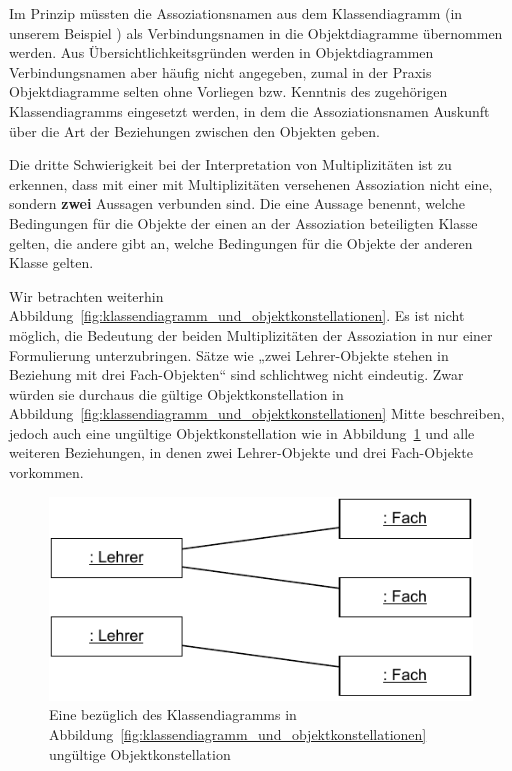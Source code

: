 Im Prinzip müssten die Assoziationsnamen aus dem Klassendiagramm (in unserem Beispiel ) als Verbindungsnamen in die Objektdiagramme übernommen werden. Aus Übersichtlichkeitsgründen werden in Objektdiagrammen Verbindungsnamen aber häufig nicht angegeben, zumal in der Praxis Objektdiagramme selten ohne Vorliegen bzw. Kenntnis des zugehörigen Klassendiagramms eingesetzt werden, in dem die Assoziationsnamen Auskunft über die Art der Beziehungen zwischen den Objekten geben.

Die dritte Schwierigkeit bei der Interpretation von Multiplizitäten ist zu erkennen, dass mit einer mit Multiplizitäten versehenen Assoziation nicht eine, sondern \textbf{zwei} Aussagen verbunden sind. Die eine Aussage benennt, welche Bedingungen für die Objekte der einen an der Assoziation beteiligten Klasse gelten, die andere gibt an, welche Bedingungen für die Objekte der anderen Klasse gelten. 

\pagebreak %

Wir betrachten weiterhin Abbildung~\ref{fig:klassendiagramm_und_objektkonstellationen}. Es ist nicht möglich, die Bedeutung der beiden Multiplizitäten der Assoziation  in nur einer Formulierung unter\-zubringen. Sätze wie „zwei Lehrer-Objekte stehen in Beziehung mit drei Fach-Objekten“ sind schlichtweg nicht eindeutig. Zwar würden sie durchaus die gültige Objektkonstellation in Abbildung~\ref{fig:klassendiagramm_und_objektkonstellationen} Mitte beschreiben, jedoch auch eine ungültige Objektkonstellation wie in Abbildung~\ref{fig:ungueltige_objektkonstellation} und alle weiteren Beziehungen, in denen zwei Lehrer-Objekte und drei Fach-Objekte vorkommen.

\begin{figure}[h!]
	\centering
	\includegraphics{Bilder/Kapitel-4/ungueltige_objektkonstellation.pdf}
	\caption[Eine ungültige Objektkonstellation zu Abb.~\ref{fig:klassendiagramm_und_objektkonstellationen}]{Eine bezüglich des Klassendiagramms in Abbildung~\ref{fig:klassendiagramm_und_objektkonstellationen} ungültige Objektkonstellation}
	\label{fig:ungueltige_objektkonstellation}
\end{figure}

